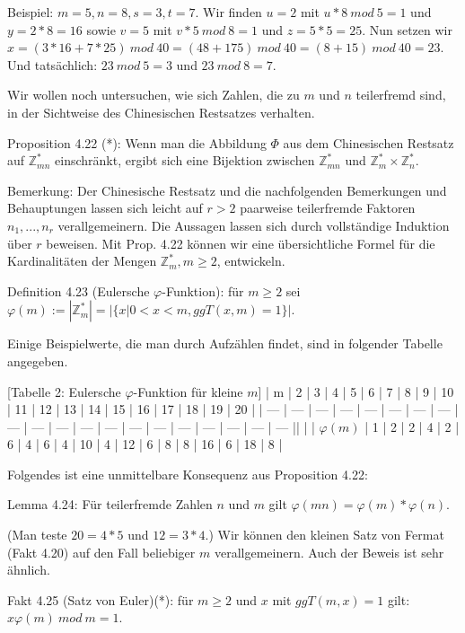 \documentclass[a4paper]{article}
\begin{document}
\begin{multicols}{3}
    Beispiel: $m=5,n=8,s=3,t=7$. Wir finden $u=2$ mit $u*8\ mod\ 5 = 1$ und $y= 2*8=16$ sowie $v=5$ mit $v*5\ mod\ 8=1$ und $z=5*5=25$. Nun setzen wir $x=(3*16+7*25) \ mod\ 40=(48+175)\ mod\ 40 = (8 + 15)\ mod\ 40 = 23$. Und tatsächlich: $23\ mod\ 5 = 3$ und $23\ mod\ 8 = 7$.

    Wir wollen noch untersuchen, wie sich Zahlen, die zu $m$ und $n$ teilerfremd sind, in der Sichtweise des Chinesischen Restsatzes verhalten.

    Proposition 4.22 (*): Wenn man die Abbildung $\Phi$ aus dem Chinesischen Restsatz auf $\mathbb{Z}^*_{mn}$ einschränkt, ergibt sich eine Bijektion zwischen $\mathbb{Z}^*_{mn}$ und $\mathbb{Z}^*_m\times\mathbb{Z}^*_n$.

    Bemerkung: Der Chinesische Restsatz und die nachfolgenden Bemerkungen und Behauptungen lassen sich leicht auf $r>2$ paarweise teilerfremde Faktoren $n_1,...,n_r$
    verallgemeinern. Die Aussagen lassen sich durch vollständige Induktion über $r$ beweisen. Mit Prop. 4.22 können wir eine übersichtliche Formel für die Kardinalitäten der Mengen $\mathbb{Z}^*_m, m\geq 2$, entwickeln.

    Definition 4.23 (Eulersche $\varphi$-Funktion): für $m\geq 2$ sei $\varphi(m):=|\mathbb{Z}^*_m| =|\{x| 0<x<m,ggT(x,m) = 1\}|$.

    Einige Beispielwerte, die man durch Aufzählen findet, sind in folgender Tabelle angegeben.

        [Tabelle 2: Eulersche $\varphi$-Funktion für kleine $m$]
    | m   | 2   | 3   | 4   | 5   | 6   | 7   | 8   | 9   | 10  | 11  | 12  | 13  | 14  | 15  | 16  | 17  | 18  | 19  | 20  |
    | --- | --- | --- | --- | --- | --- | --- | --- | --- | --- | --- | --- | --- | --- | --- | --- | --- | --- | --- | --- ||  |
    | $\varphi(m)$ | 1   | 2   | 2   | 4   | 2   | 6   | 4   | 6   | 4   | 10  | 4   | 12  | 6   | 8   | 8   | 16  | 6   | 18  | 8   |

    Folgendes ist eine unmittelbare Konsequenz aus Proposition 4.22:

    Lemma 4.24: Für teilerfremde Zahlen $n$ und $m$ gilt $\varphi(mn)=\varphi(m)*\varphi(n)$.

    (Man teste $20=4*5$ und $12=3*4$.)
    Wir können den kleinen Satz von Fermat (Fakt 4.20) auf den Fall beliebiger $m$ verallgemeinern. Auch der Beweis ist sehr ähnlich.

    Fakt 4.25 (Satz von Euler)(*): für $m\geq 2$ und $x$ mit $ggT(m,x) = 1$ gilt: $x\varphi(m)\ mod\ m=1$.


\end{multicols}
\end{document}
